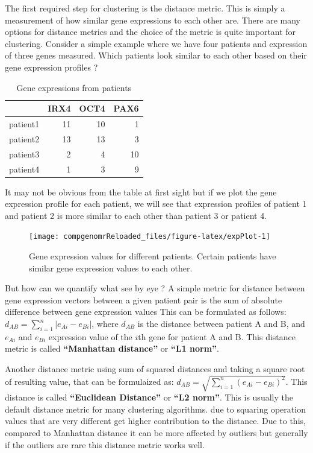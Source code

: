 \documentclass[12pt,]{krantz}
\theoremstyle{definition}
\theoremstyle{definition}
\theoremstyle{definition}
\theoremstyle{remark}
\begin{document}
The first required step for clustering is the distance metric. This is
simply a measurement of how similar gene expressions to each other are.
There are many options for distance metrics and the choice of the metric
is quite important for clustering. Consider a simple example where we
have four patients and expression of three genes measured. Which
patients look similar to each other based on their gene expression
profiles ?

\begin{table}

\caption{\label{tab:expTable}Gene expressions from patients}
\centering
\begin{tabular}[t]{l|r|r|r}
\hline
  & IRX4 & OCT4 & PAX6\\
\hline
patient1 & 11 & 10 & 1\\
\hline
patient2 & 13 & 13 & 3\\
\hline
patient3 & 2 & 4 & 10\\
\hline
patient4 & 1 & 3 & 9\\
\hline
\end{tabular}
\end{table}

It may not be obvious from the table at first sight but if we plot the
gene expression profile for each patient, we will see that expression
profiles of patient 1 and patient 2 is more similar to each other than
patient 3 or patient 4.

\begin{figure}

{\centering \texttt{[image: compgenomrReloaded\_files/figure-latex/expPlot-1]} 

}

\caption{Gene expression values for different patients. Certain patients have similar gene expression values to each other.}\label{fig:expPlot}
\end{figure}

But how can we quantify what see by eye ? A simple metric for distance
between gene expression vectors between a given patient pair is the sum
of absolute difference between gene expression values This can be
formulated as follows: \(d_{AB}={\sum _{i=1}^{n}|e_{Ai}-e_{Bi}|}\),
where \(d_{AB}\) is the distance between patient A and B, and \(e_{Ai}\)
and \(e_{Bi}\) expression value of the \(i\)th gene for patient A and B.
This distance metric is called \textbf{``Manhattan distance''} or
\textbf{``L1 norm''}.

Another distance metric using sum of squared distances and taking a
square root of resulting value, that can be formulaized as:
\(d_{AB}={{\sqrt {\sum _{i=1}^{n}(e_{Ai}-e_{Bi})^{2}}}}\). This distance
is called \textbf{``Euclidean Distance''} or \textbf{``L2 norm''}. This
is usually the default distance metric for many clustering algorithms.
due to squaring operation values that are very different get higher
contribution to the distance. Due to this, compared to Manhattan
distance it can be more affected by outliers but generally if the
outliers are rare this distance metric works well.
\end{document}

